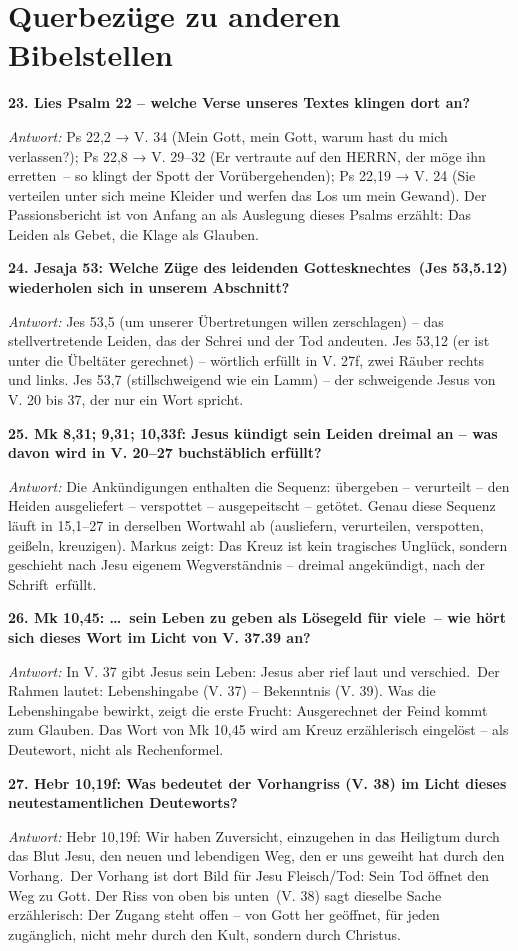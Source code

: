 \documentclass[12pt,a4paper]{article}
\newcommand{\frage}[1]{\par\vspace{0.7em}\noindent\textbf{#1}\par}
\newcommand{\antwort}[1]{\par\noindent\textit{Antwort:} #1\par}
\begin{document}
\section*{Querbezüge zu anderen Bibelstellen}

\frage{23. Lies Psalm 22 -- welche Verse unseres Textes klingen dort an?}
\antwort{Ps 22,2 → V. 34 (\glqq Mein Gott, mein Gott, warum hast du mich verlassen?\grqq{}); Ps 22,8 → V. 29--32 (\glqq Er vertraute auf den HERRN, der möge ihn erretten\grqq\ -- so klingt der Spott der Vorübergehenden); Ps 22,19 → V. 24 (\glqq Sie verteilen unter sich meine Kleider und werfen das Los um mein Gewand\grqq{}). Der Passionsbericht ist von Anfang an als Auslegung dieses Psalms erzählt: Das Leiden als Gebet, die Klage als Glauben.}

\frage{24. Jesaja 53: Welche Züge des \glqq leidenden Gottesknechtes\grqq\ (Jes 53,5.12) wiederholen sich in unserem Abschnitt?}
\antwort{Jes 53,5 (\glqq um unserer Übertretungen willen zerschlagen\grqq{}) -- das stellvertretende Leiden, das der Schrei und der Tod andeuten. Jes 53,12 (\glqq er ist unter die Übeltäter gerechnet\grqq{}) -- wörtlich erfüllt in V. 27f, zwei Räuber rechts und links. Jes 53,7 (stillschweigend wie ein Lamm) -- der schweigende Jesus von V. 20 bis 37, der nur ein Wort spricht.}

\frage{25. Mk 8,31; 9,31; 10,33f: Jesus kündigt sein Leiden dreimal an -- was davon wird in V. 20--27 buchstäblich erfüllt?}
\antwort{Die Ankündigungen enthalten die Sequenz: übergeben -- verurteilt -- den Heiden ausgeliefert -- verspottet -- ausgepeitscht -- getötet. Genau diese Sequenz läuft in 15,1--27 in derselben Wortwahl ab (\glqq ausliefern\grqq{}, \glqq verurteilen\grqq{}, \glqq verspotten\grqq{}, \glqq geißeln\grqq{}, \glqq kreuzigen\grqq{}). Markus zeigt: Das Kreuz ist kein tragisches Unglück, sondern geschieht nach Jesu eigenem Wegverständnis -- dreimal angekündigt, \glqq nach der Schrift\grqq\ erfüllt.}

\frage{26. Mk 10,45: \glqq \ldots\ sein Leben zu geben als Lösegeld für viele\grqq\ -- wie hört sich dieses Wort im Licht von V. 37.39 an?}
\antwort{In V. 37 gibt Jesus sein Leben: \glqq Jesus aber rief laut und verschied.\grqq\ Der Rahmen lautet: Lebenshingabe (V. 37) -- Bekenntnis (V. 39). Was die Lebenshingabe bewirkt, zeigt die erste Frucht: Ausgerechnet der Feind kommt zum Glauben. Das Wort von Mk 10,45 wird am Kreuz erzählerisch eingelöst -- als Deutewort, nicht als Rechenformel.}

\frage{27. Hebr 10,19f: Was bedeutet der Vorhangriss (V. 38) im Licht dieses neutestamentlichen Deuteworts?}
\antwort{Hebr 10,19f: \glqq Wir haben Zuversicht, einzugehen in das Heiligtum durch das Blut Jesu, den neuen und lebendigen Weg, den er uns geweiht hat durch den Vorhang.\grqq\ Der Vorhang ist dort Bild für Jesu Fleisch/Tod: Sein Tod öffnet den Weg zu Gott. Der Riss \glqq von oben bis unten\grqq\ (V. 38) sagt dieselbe Sache erzählerisch: Der Zugang steht offen -- von Gott her geöffnet, für jeden zugänglich, nicht mehr durch den Kult, sondern durch Christus.}
\end{document}
